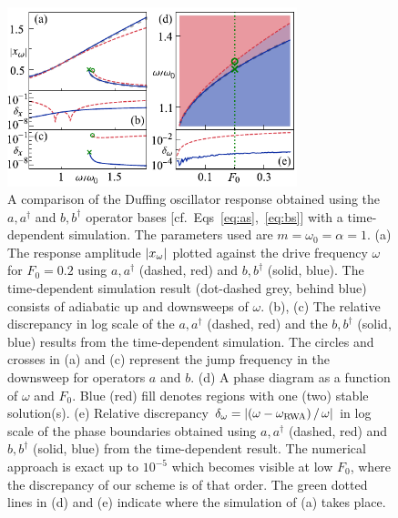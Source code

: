 \begin{figure}
	\centering
	\includegraphics[width=0.75\textwidth]{figures/rwa/fig2.pdf}
	\caption{A comparison of the Duffing oscillator response obtained using the $a, a^\dagger$ and $b, b^\dagger$ operator bases [cf.~Eqs~\eqref{eq:as},~\eqref{eq:bs}] with a time-dependent simulation. The parameters used are $m=\omega_0=\alpha=1$. (a) The response amplitude $\abs{x_\omega}$ plotted against the drive frequency $\omega$ for $F_0=0.2$ using $a, a^\dagger$ (dashed, red) and $b,b^\dagger$ (solid, blue). The time-dependent simulation result (dot-dashed grey, behind blue) consists of adiabatic up and downsweeps of $\omega$.
		(b), (c) The relative discrepancy in log scale of the $a,a^\dagger$ (dashed, red) and the $b, b^\dagger$ (solid, blue) results from the time-dependent simulation. %
		The circles and crosses in (a) and (c) represent the jump frequency in the downsweep for operators $a$ and $b$.
		(d) A phase diagram as a function of $\omega$ and $F_0$. Blue (red) fill denotes regions with one (two) stable solution(s). %
		(e) Relative discrepancy $\delta_{\omega} = \abs{(\omega - \omega_{\text{RWA}}) \,/\, \omega }$ in log scale of the phase boundaries obtained using $a, a^\dagger$ (dashed, red) and $b, b^\dagger$ (solid, blue) from the time-dependent result. The numerical approach is exact up to $10^{-5}$ which becomes visible at low $F_0$, where the discrepancy of our scheme is of that order. The green dotted lines in (d) and (e) indicate where the simulation of (a) takes place.
	}
	\label{fig:fig2}
\end{figure}

